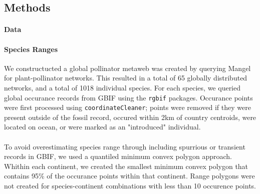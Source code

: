 \documentclass[12pt]{article}
\begin{document}
\paragraph*{}






\paragraph*{}




\paragraph*{}













\subsection*{Methods}

\paragraph*{Data}




\paragraph*{Species Ranges}
  We constructucted a global pollinator metaweb was created by querying Mangel for plant-pollinator networks. This resulted in a total of 65 globally distributed networks, and a total of 1018 individual species. For each species, we queried global occurance records from GBIF using the \texttt{rgbif} packages. Occurance points were first processed using \texttt{coordinateCleaner}; points were removed if they were present outside of the fossil record, occured within 2km of country centroids, were located on ocean, or were marked as an "introduced" individual.

\paragraph{} To avoid overestimating species range through including spurrious or transient records in GBIF, we used a quantiled minimum convex polygon approach. Whithin each continent, we created the smallest minimum convex polygon that contains 95\% of the occurance points within that continent. Range polygons were not created for species-continent combinations with less than 10 occurence points. 
\end{document}

